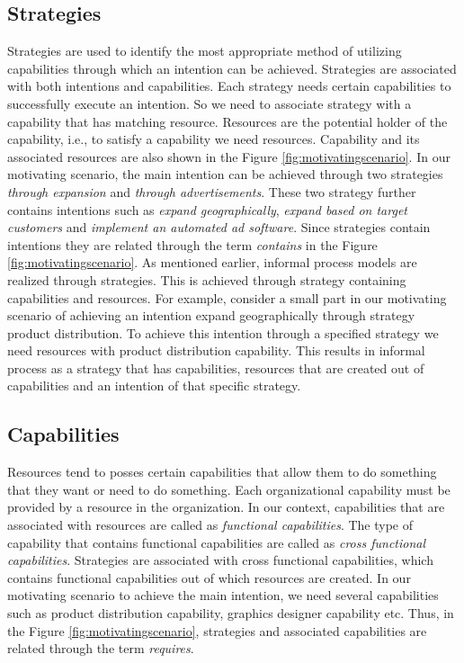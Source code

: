 \subsection{Strategies} 
\label{sec:strategies}
Strategies are used to identify the most appropriate method of utilizing capabilities through which an intention can be achieved. Strategies are associated with both intentions and capabilities. Each strategy needs certain capabilities to successfully execute an intention. So we need to associate strategy with a capability that has matching resource. Resources are the potential holder of the capability, i.e., to satisfy a capability we need resources. Capability and its associated resources are also shown in the Figure \ref{fig:motivatingscenario}. In our motivating scenario, the main intention can be achieved through two strategies \textit{through expansion} and \textit{through advertisements}. These two strategy further contains intentions such as \textit{expand geographically}, \textit{expand based on target customers} and \textit{implement an automated ad software}. Since strategies contain intentions they are related through the term \textit{contains} in the Figure \ref{fig:motivatingscenario}. As mentioned earlier, informal process models are realized through strategies. This is achieved through strategy containing capabilities and resources. For example, consider a small part in our motivating scenario of achieving an intention expand geographically through strategy product distribution. To achieve this intention through a specified strategy we need resources with product distribution capability. This results in informal process as a strategy that has capabilities, resources that are created out of capabilities and an intention of that specific strategy.

\subsection{Capabilities}
\label{sec:capabilities}
Resources tend to posses certain capabilities that allow them to do something that they want or need to do something. Each organizational capability must be provided by a resource in the organization. In our context, capabilities that are associated with resources are called as \textit{functional capabilities}. The type of capability that contains functional capabilities are called as \textit{cross functional capabilities}. Strategies are associated with cross functional capabilities, which contains functional capabilities out of which resources are created. In our motivating scenario to achieve the main intention, we need several capabilities such as product distribution capability, graphics designer capability etc. Thus, in the Figure \ref{fig:motivatingscenario}, strategies and associated capabilities are related through the term \textit{requires}. 


